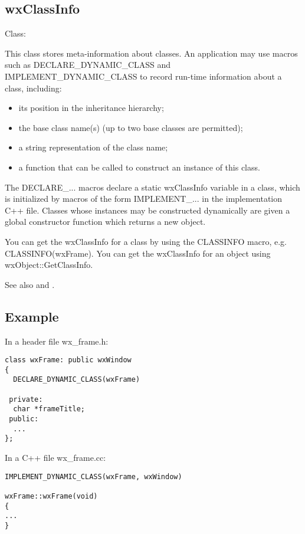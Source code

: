 \subsection{wxClassInfo}\label{wxclassinfooverview}


Class: 

This class stores meta-information about classes. An application
may use macros such as DECLARE\_DYNAMIC\_CLASS and IMPLEMENT\_DYNAMIC\_CLASS
to record run-time information about a class, including:

\begin{itemize}\itemsep=0pt
\item its position in the inheritance hierarchy;
\item the base class name(s) (up to two base classes are permitted);
\item a string representation of the class name;
\item a function that can be called to construct an instance of this class.
\end{itemize}

The DECLARE\_... macros declare a static wxClassInfo variable in a class, which is initialized
by macros of the form IMPLEMENT\_... in the implementation C++ file. Classes whose instances may be
constructed dynamically are given a global constructor function which returns a new object.

You can get the wxClassInfo for a class by using the CLASSINFO macro, e.g. CLASSINFO(wxFrame).
You can get the wxClassInfo for an object using wxObject::GetClassInfo.

See also  and .

\subsection{Example}

In a header file wx\_frame.h:

\begin{verbatim}
class wxFrame: public wxWindow
{
  DECLARE_DYNAMIC_CLASS(wxFrame)

 private:
  char *frameTitle;
 public:
  ...
};
\end{verbatim}

In a C++ file wx\_frame.cc:

\begin{verbatim}
IMPLEMENT_DYNAMIC_CLASS(wxFrame, wxWindow)

wxFrame::wxFrame(void)
{
...
}
\end{verbatim}


